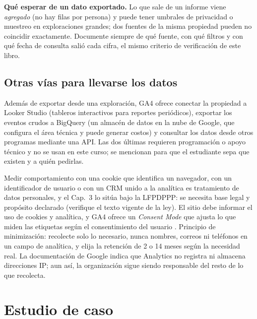 \begin{cajaAtencion}
\textbf{Qué esperar de un dato exportado.} Lo que sale de un informe viene
\emph{agregado} (no hay filas por persona) y puede tener umbrales de
privacidad o muestreo en exploraciones grandes; dos fuentes de la misma
propiedad pueden no coincidir exactamente. Documente siempre de qué fuente,
con qué filtros y con qué fecha de consulta salió cada cifra, el mismo
criterio de verificación de este libro.
\end{cajaAtencion}

\subsection{Otras vías para llevarse los datos}

Además de exportar desde una exploración, GA4 ofrece conectar la propiedad a
Looker Studio (tableros interactivos para reportes periódicos), exportar los
eventos crudos a BigQuery (un almacén de datos en la nube de Google, que
configura el área técnica y puede generar costos) y consultar los datos desde
otros programas mediante una API. Las dos últimas requieren programación o
apoyo técnico y no se usan en este curso; se mencionan para que el estudiante
sepa que existen y a quién pedirlas.

\begin{cajaEtica}
Medir comportamiento con una cookie que identifica un navegador, con un
identificador de usuario o con un CRM unido a la analítica es tratamiento de
datos personales, y el Cap.~3 lo sitúa bajo la LFPDPPP: se necesita base legal
y propósito declarado (verifique el texto vigente de la ley). El sitio debe
informar el uso de cookies y analítica, y GA4 ofrece un \textit{Consent Mode}
que ajusta lo que miden las etiquetas según el consentimiento del usuario
\parencite{google2026ga4consent}. Principio de minimización: recolecte solo lo
necesario, nunca nombres, correos ni teléfonos en un campo de analítica, y
elija la retención de 2 o 14 meses según la necesidad real. La documentación
de Google indica que Analytics no registra ni almacena direcciones IP; aun
así, la organización sigue siendo responsable del resto de lo que recolecta.
\end{cajaEtica}

\section{Estudio de caso}

